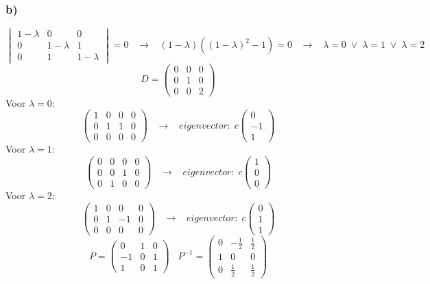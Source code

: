 \documentclass[11pt]{article}
\begin{document}
\subsubsection*{b)}
\[
\begin{vmatrix}
1-\lambda & 0 & 0\\
0 & 1- \lambda & 1 \\
0 & 1 & 1-\lambda
\end{vmatrix}
=0
\;\;\;\longrightarrow\;\;\;
(1-\lambda)((1-\lambda)^2-1)=0
\;\;\;\longrightarrow\;\;\;
\lambda = 0 \;\vee\; \lambda = 1 \;\vee\; \lambda = 2
\]
\[
D = 
\begin{pmatrix}
0 & 0 & 0\\
0 & 1 & 0\\
0 & 0 & 2
\end{pmatrix}
\]
Voor $\lambda = 0$: 
\[
\left(
\begin{array}{ccc|c}
1 & 0 & 0 & 0\\
0 & 1 & 1 & 0\\
0 & 0 & 0 & 0
\end{array}
\right)
\;\;\;\longrightarrow\;\;\;
eigenvector:\;
c
\begin{pmatrix}
0\\-1\\1
\end{pmatrix}
\]
Voor $\lambda = 1$: 
\[
\left(
\begin{array}{ccc|c}
0 & 0 & 0 & 0\\
0 & 0 & 1 & 0\\
0 & 1 & 0 & 0
\end{array}
\right)
\;\;\;\longrightarrow\;\;\;
eigenvector:\;
c
\begin{pmatrix}
1\\0\\0
\end{pmatrix}
\]
Voor $\lambda = 2$: 
\[
\left(
\begin{array}{ccc|c}
1 & 0 & 0 & 0\\
0 & 1 & -1 & 0\\
0 & 0 & 0 & 0
\end{array}
\right)
\;\;\;\longrightarrow\;\;\;
eigenvector:\;
c
\begin{pmatrix}
0\\1\\1
\end{pmatrix}
\]
\[
P = 
\begin{pmatrix}
0 & 1 & 0\\
-1 & 0 & 1\\
1 & 0 & 1
\end{pmatrix}
\;\;\;
P^{-1} = 
\begin{pmatrix}
0 & -\frac{1}{2} & \frac{1}{2}\\
1 & 0 & 0\\
0 & \frac{1}{2} & \frac{1}{2}
\end{pmatrix}
\]
\end{document}
